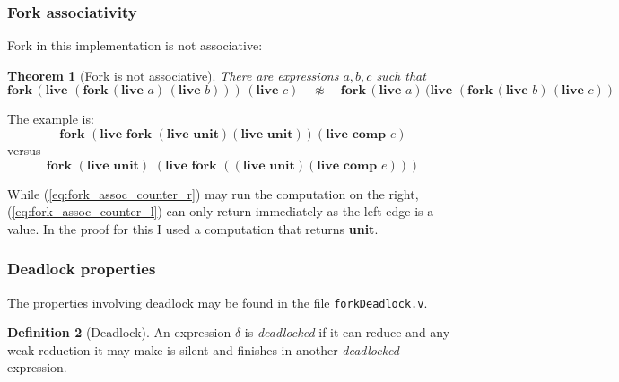 \documentclass[12pt,twoside,notitlepage]{report}
\theoremstyle{plain}%
\newtheorem{thm}{Theorem}[section]
\theoremstyle{definition}
\newtheorem{defn}[thm]{Definition}
\theoremstyle{remark}
\begin{document}
\subsubsection{Fork associativity}
Fork in this implementation is not associative:

\begin{thm}[Fork is not associative]
There are expressions $a, b, c$ such that
\[  \textbf{fork}\,(\textbf{live }(\textbf{fork}\,(\textbf{live }a)\,(\textbf{live }b)))\,(\textbf{live }c)\quad \not\approx \quad \textbf{fork}\,(\textbf{live }a)\,(\textbf{live }(\textbf{fork}\,(\textbf{live }b)\,(\textbf{live }c)) \]
\end{thm}

The example is:
\[ \textbf{fork } (\textbf{live }\textbf{fork }(\textbf{live }\textbf{unit})  (\textbf{live }\textbf{unit}))  (\textbf{live }\textbf{comp } e) \tag{R-Assoc} \label{eq:fork_assoc_counter_r} \]
versus
\[ \textbf{fork } (\textbf{live }\textbf{unit})\,\,(\textbf{live }  \textbf{fork } ((\textbf{live }\textbf{unit})  (\textbf{live }\textbf{comp } e))) \tag{L-Assoc} \label{eq:fork_assoc_counter_l} \]

While (\ref{eq:fork_assoc_counter_r}) may run the computation on the right, (\ref{eq:fork_assoc_counter_l}) can only return immediately as the left edge is a value. In the proof for this I used a computation that returns \textbf{unit}.

\subsubsection{Deadlock properties}
The properties involving deadlock may be found in the file \verb|forkDeadlock.v|.

\begin{defn}[Deadlock]
An expression $ \delta $ is \textit{deadlocked} if it can reduce and any weak reduction it may make is silent and finishes in another \textit{deadlocked} expression. 
\end{defn}
\end{document}
